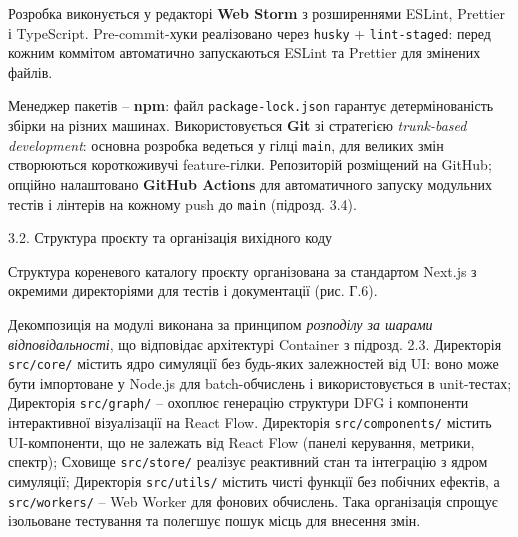 \documentclass[
]{article}
\newcommand{\passthrough}[1]{#1}
\begin{document}
Розробка виконується у редакторі \textbf{Web Storm} з розширеннями
ESLint, Prettier і TypeScript. Pre-commit-хуки реалізовано через
\passthrough{\lstinline!husky!} +
\passthrough{\lstinline!lint!}\passthrough{\lstinline!-!}\passthrough{\lstinline!staged!}:
перед кожним коммітом автоматично запускаються ESLint та Prettier для
змінених файлів.

Менеджер пакетів -- \textbf{npm}: файл
\passthrough{\lstinline!package!}\passthrough{\lstinline!-!}\passthrough{\lstinline!lock!}\passthrough{\lstinline!.!}\passthrough{\lstinline!json!}
гарантує детермінованість збірки на різних машинах. Використовується
\textbf{Git} зі стратегією \emph{trunk-based development}: основна
розробка ведеться у гілці \passthrough{\lstinline!main!}, для великих
змін створюються короткоживучі feature-гілки. Репозиторій розміщений на
GitHub; опційно налаштовано \textbf{GitHub Actions} для автоматичного
запуску модульних тестів і лінтерів на кожному push до
\passthrough{\lstinline!main!} (підрозд. 3.4).

\protect{}\label{X167ffd08ffc49c19e5d17ce877b0967d41b68f7}{}3.2.
Структура проєкту та організація вихідного коду

Структура кореневого каталогу проєкту організована за стандартом Next.js
з окремими директоріями для тестів і документації (рис. Г.6).

Декомпозиція на модулі виконана за принципом \emph{розподілу за шарами
відповідальності}, що відповідає архітектурі Container з підрозд. 2.3.
Директорія
\passthrough{\lstinline!src!}\passthrough{\lstinline!/!}\passthrough{\lstinline!core!}\passthrough{\lstinline!/!}
містить ядро симуляції без будь-яких залежностей від UI: воно може бути
імпортоване у Node.js для batch-обчислень і використовується в
unit-тестах; Директорія
\passthrough{\lstinline!src!}\passthrough{\lstinline!/!}\passthrough{\lstinline!graph!}\passthrough{\lstinline!/!}
-- охоплює генерацію структури DFG і компоненти інтерактивної
візуалізації на React Flow. Директорія
\passthrough{\lstinline!src!}\passthrough{\lstinline!/!}\passthrough{\lstinline!components!}\passthrough{\lstinline!/!}
містить UI-компоненти, що не залежать від React Flow (панелі керування,
метрики, спектр); Сховище
\passthrough{\lstinline!src!}\passthrough{\lstinline!/!}\passthrough{\lstinline!store!}\passthrough{\lstinline!/!}
реалізує реактивний стан та інтеграцію з ядром симуляції; Директорія
\passthrough{\lstinline!src!}\passthrough{\lstinline!/!}\passthrough{\lstinline!utils!}\passthrough{\lstinline!/!}
містить чисті функції без побічних ефектів, а
\passthrough{\lstinline!src!}\passthrough{\lstinline!/!}\passthrough{\lstinline!workers!}\passthrough{\lstinline!/!}
-- Web Worker для фонових обчислень. Така організація спрощує ізольоване
тестування та полегшує пошук місць для внесення змін.
\end{document}
